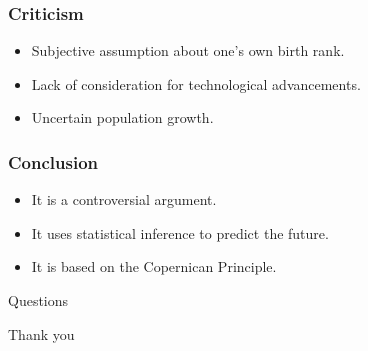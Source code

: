 \documentclass[
    10pt,
    aspectratio=169,
    xcolor={dvipsnames},
]{beamer}
\begin{document}
\begin{frame}
    \frametitle{Criticism}
    \begin{itemize}
        \item Subjective assumption about one's own birth rank.
        \item Lack of consideration for technological advancements.
        \item Uncertain population growth.
    \end{itemize}
\end{frame}

\begin{frame}
    \frametitle{Conclusion}
    \begin{itemize}
        \item It is a controversial argument.
        \item It uses statistical inference to predict the future.
        \item It is based on the Copernican Principle.
    \end{itemize}
\end{frame}

\begin{frame}
    Questions
\end{frame}

\begin{frame}
    Thank you
\end{frame}
\end{document}
